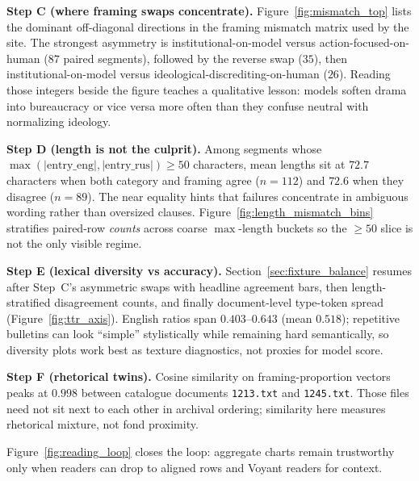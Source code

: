 \documentclass[11pt,a4paper]{article}
\theoremstyle{remark}
\begin{document}
\textbf{Step C (where framing swaps concentrate).} Figure~\ref{fig:mismatch_top} lists the dominant off-diagonal directions in the framing mismatch matrix used by the site. The strongest asymmetry is institutional-on-model versus action-focused-on-human ($87$ paired segments), followed by the reverse swap ($35$), then institutional-on-model versus ideological-discrediting-on-human ($26$). Reading those integers beside the figure teaches a qualitative lesson: models soften drama into bureaucracy or vice versa more often than they confuse neutral with normalizing ideology.

\textbf{Step D (length is not the culprit).} Among segments whose $\max(|\mathrm{entry\_eng}|,|\mathrm{entry\_rus}|)\ge 50$ characters, mean lengths sit at $72.7$ characters when both category and framing agree ($n=112$) and $72.6$ when they disagree ($n=89$). The near equality hints that failures concentrate in ambiguous wording rather than oversized clauses. Figure~\ref{fig:length_mismatch_bins} stratifies paired-row \emph{counts} across coarse $\max$-length buckets so the $\ge 50$ slice is not the only visible regime.

\textbf{Step E (lexical diversity vs accuracy).} Section~\ref{sec:fixture_balance} resumes after Step~C's asymmetric swaps with headline agreement bars, then length-stratified disagreement counts, and finally document-level type-token spread (Figure~\ref{fig:ttr_axis}). English ratios span $0.403$--$0.643$ (mean $0.518$); repetitive bulletins can look ``simple'' stylistically while remaining hard semantically, so diversity plots work best as texture diagnostics, not proxies for model score.

\textbf{Step F (rhetorical twins).} Cosine similarity on framing-proportion vectors peaks at $0.998$ between catalogue documents \texttt{1213.txt} and \texttt{1245.txt}. Those files need not sit next to each other in archival ordering; similarity here measures rhetorical mixture, not fond proximity.

Figure~\ref{fig:reading_loop} closes the loop: aggregate charts remain trustworthy only when readers can drop to aligned rows and Voyant readers for context.
\end{document}
